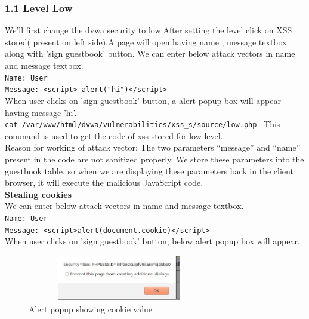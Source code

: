 \documentclass{article}
\begin{document}
\subsubsection*{1.1 Level Low}
We'll first change the dvwa security to low.After setting the level click on XSS stored( present on left side).A page will open having name , message textbox along with 'sign guestbook' button. We can enter below attack vectors in name and message textbox.\\
{\tt Name: User}\\
{\tt Message: <script> alert("hi")</script>}\\
When user clicks on 'sign guestbook' button, a alert popup box will appear having message 'hi'.\\
{\tt cat /var/www/html/dvwa/vulnerabilities/xss\_s/source/low.php} --This command is used to get the code of xss stored for low level.\\
Reason for working of attack vector: The two parameters “message” and “name” present in the code are not sanitized properly. We store these
parameters into the guestbook table, so when we are displaying these parameters back in the client browser,
it will execute the malicious JavaScript code.\\
\textbf{Stealing cookies}\\
 We can enter below attack vectors in name and message textbox.\\
{\tt Name: User}\\
{\tt Message: <script>alert(document.cookie)</script>}\\
When user clicks on 'sign guestbook' button, below alert popup box will appear.\\
	\begin{figure}[htb]
	    \begin{center}
		\includegraphics[width=8cm,height=2cm]{cookies.jpg}
		\caption{Alert popup showing cookie value}
	    \end{center}
	\end{figure}
\end{document}
